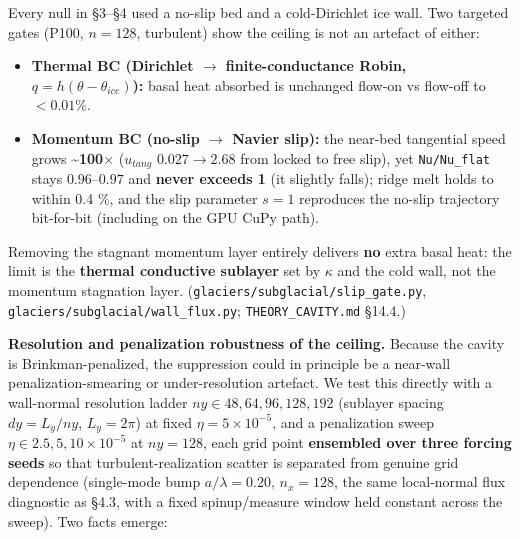 \documentclass[tc, manuscript]{copernicus}
\begin{document}
Every null in §3–§4 used a no-slip bed and a cold-Dirichlet ice wall. Two targeted gates (P100, $n=128$, turbulent) show the ceiling is not an artefact of either:

\begin{itemize}
\item \textbf{Thermal BC (Dirichlet \ensuremath{\to} finite-conductance Robin, $q=h(\theta -\theta _{ice})$):} basal heat absorbed is unchanged flow-on vs flow-off to \textbf{$<0.01\%$}.
\item \textbf{Momentum BC (no-slip \ensuremath{\to} Navier slip):} the near-bed tangential speed grows \textbf{\textasciitilde{}100\ensuremath{\times}} ($u_{tang}$ $0.027 \to  2.68$ from locked to free slip), yet \texttt{Nu/\allowbreak{}Nu\_\allowbreak{}flat} stays $0.96\mbox{--}0.97$ and \textbf{never exceeds 1} (it slightly falls); ridge melt holds to within 0.4 \%, and the slip parameter $s=1$ reproduces the no-slip trajectory bit-for-bit (including on the GPU CuPy path).
\end{itemize}

Removing the stagnant momentum layer entirely delivers \textbf{no} extra basal heat: the limit is the \textbf{thermal conductive sublayer} set by $\kappa $ and the cold wall, not the momentum stagnation layer. (\texttt{glaciers/\allowbreak{}subglacial/\allowbreak{}slip\_\allowbreak{}gate.\allowbreak{}py}, \texttt{glaciers/\allowbreak{}subglacial/\allowbreak{}wall\_\allowbreak{}flux.\allowbreak{}py}; \texttt{THEORY\_\allowbreak{}CAVITY.\allowbreak{}md} §14.4.)

\textbf{Resolution and penalization robustness of the ceiling.} Because the cavity is Brinkman-penalized, the suppression could in principle be a near-wall penalization-smearing or under-resolution artefact. We test this directly with a wall-normal resolution ladder $ny\in {48,64,96,128,192}$ (sublayer spacing $dy=L_{y}/ny$, $L_{y}=2\pi $) at fixed $\eta =5\times 10^{-5}$, and a penalization sweep $\eta \in {2.5,5,10}\times 10^{-5}$ at $ny=128$, each grid point \textbf{ensembled over three forcing seeds} so that turbulent-realization scatter is separated from genuine grid dependence (single-mode bump $a/\lambda =0.20$, $n_{x}=128$, the same local-normal flux diagnostic as §4.3, with a fixed spinup/measure window held constant across the sweep). Two facts emerge:
\end{document}
